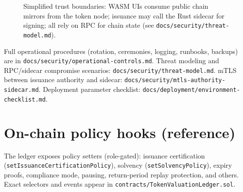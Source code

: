 \documentclass[11pt,a4paper]{article}
\begin{document}
\begin{figure}[htbp]
\centering
{}
\caption{Simplified trust boundaries: WASM UIs consume public chain mirrors from the token node; issuance may call the Rust sidecar for signing; all rely on RPC for chain state (see \texttt{docs/security/threat-model.md}).}
\label{fig:arch}
\end{figure}

\noindent
Full operational procedures (rotation, ceremonies, logging, runbooks, backups) are in
\texttt{docs/security/operational-controls.md}. Threat modeling and RPC/sidecar compromise scenarios:
\texttt{docs/security/threat-model.md}. mTLS between issuance authority and sidecar:
\texttt{docs/security/mtls-authority-sidecar.md}. Deployment parameter checklist:
\texttt{docs/deployment/environment-checklist.md}.

\section{On-chain policy hooks (reference)}
\label{sec:policies}

The ledger exposes policy setters (role-gated): issuance certification (\texttt{setIssuanceCertificationPolicy}),
solvency (\texttt{setSolvencyPolicy}), expiry proofs, compliance mode, pausing, return-period replay
protection, and others. Exact selectors and events appear in \texttt{contracts/TokenValuationLedger.sol}.
\end{document}
